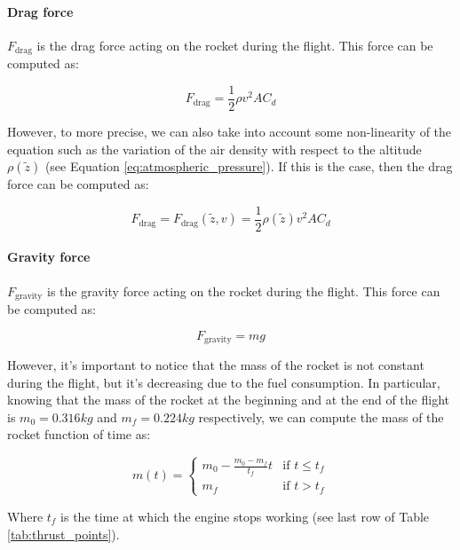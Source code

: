 \paragraph{Drag force}

$F_{\text{drag}}$ is the drag force acting on the rocket during the flight.
This force can be computed as:

\begin{equation}
    F_{\text{drag}} = \frac{1}{2} \rho v^2 A C_d
\end{equation}

However, to more precise, we can also take into account some non-linearity of the equation such as the variation of the air density with respect to the altitude $\rho(\tilde{z})$ (see Equation \ref{eq:atmospheric_pressure}).
If this is the case, then the drag force can be computed as:

\begin{equation}
    F_{\text{drag}} = F_{\text{drag}}(\tilde{z}, v) = \frac{1}{2} \rho(\tilde{z}) v^2 A C_d
\end{equation}


\paragraph{Gravity force}

$F_{\text{gravity}}$ is the gravity force acting on the rocket during the flight.
This force can be computed as:

\begin{equation}
    F_{\text{gravity}} = m g
\end{equation}

However, it's important to notice that the mass of the rocket is not constant during the flight, but it's decreasing due to the fuel consumption.
In particular, knowing that the mass of the rocket at the beginning and at the end of the flight is $m_0 = 0.316kg$ and $m_f = 0.224kg$ respectively, we can compute the mass of the rocket function of time as:

\begin{equation}
    m(t) = \begin{cases}
        m_0 - \frac{m_0 - m_f}{t_f} t & \text{if } t \leq t_f \\
        m_f                           & \text{if } t > t_f
    \end{cases}
\end{equation}

Where $t_f$ is the time at which the engine stops working (see last row of Table \ref{tab:thrust_points}).

